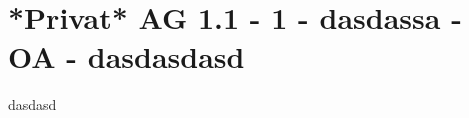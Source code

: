 \section{*Privat* AG 1.1 - 1 - dasdassa - OA - dasdasdasd}

\begin{beispiel}[AG 1.1]{1}
dasdasd
\end{beispiel}